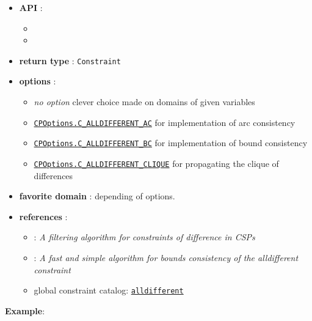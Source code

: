 \begin{itemize}
	\item \textbf{API} :
	\begin{itemize}
		\item {}
		\item {}
	\end{itemize}
	\item \textbf{return type} : \texttt{Constraint}
	\item \textbf{options} :
	\begin{itemize}
		\item \emph{no option} clever choice made on domains of given variables
		\item \hyperlink{calldiffac:calldiffacoptions}{\tt CPOptions.C\_ALLDIFFERENT\_AC} for \cite{ReginAAAI94} implementation of arc consistency
		\item \hyperlink{calldiffbc:calldiffbcoptions}{\tt CPOptions.C\_ALLDIFFERENT\_BC} for \cite{LopezIJCAI03} implementation of bound consistency
		\item \hyperlink{calldiffclique:calldiffcliqueoptions}{\tt CPOptions.C\_ALLDIFFERENT\_CLIQUE} for propagating the clique of differences
	\end{itemize}
	\item \textbf{favorite domain} : depending of options.
	\item \textbf{references} :
      \begin{itemize}
      \item  \cite{ReginAAAI94}: \emph{A filtering algorithm for constraints of difference in CSPs}
      \item  \cite{LopezIJCAI03}: \emph{A fast and simple algorithm for bounds consistency of the alldifferent constraint}
      \item global constraint catalog: \href{http://www.emn.fr/x-info/sdemasse/gccat/Calldifferent.html}{\tt alldifferent}
      \end{itemize}
\end{itemize}



\textbf{Example}:

